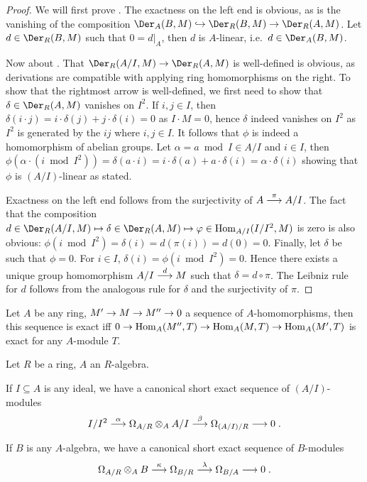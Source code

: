 \documentclass[a4paper,parskip=half,numbers=enddot, DIV=12, headheight=30pt]{scrreprt}
\begin{document}
\begin{proof}
    We will first prove . The exactness on the left end is obvious, as is the vanishing of the composition $\Der_A(B,M) \monomorphism \Der_R(B,M) \morphism \Der_R(A,M)$. Let $d\in \Der_R(B,M)$ such that $0 = d|_A$, then $d$ is $A$-linear, i.e.\ $d\in \Der_A(B,M)$.
    
    Now about . That $\Der_R(A/I,M) \morphism \Der_R(A,M)$ is well-defined is obvious, as derivations are compatible with applying ring homomorphisms on the right. To show that the rightmost arrow is well-defined, we first need to show that $\delta\in\Der_R(A,M)$ vanishes on $I^2$. If $i,j\in I$, then $\delta(i\cdot j)=i\cdot\delta(j)+j\cdot\delta(i)=0$ as $I\cdot M=0$, hence $\delta$ indeed vanishes on $I^2$ as $I^2$ is generated by the $ij$ where $i,j\in I$. It follows that $\phi$ is indeed a homomorphism of abelian groups. Let $\alpha = a\bmod I\in A/I$ and $i\in I$, then $\phi(\alpha \cdot (i\bmod I^2)) = \delta(a\cdot i) = i\cdot \delta(a) + a\cdot \delta(i) = \alpha\cdot\delta(i)$ showing that $\phi$ is $(A/I)$-linear as stated. 
    
    Exactness on the left end follows from the surjectivity of $A\morphism[\pi] A/I$. The fact that the composition $d\in\Der_R(A/I,M)\mapsto\delta\in\Der_R(A,M)\mapsto\phi\in\Hom_{A/I}(I/I^2,M)$ is zero is also obvious: $\phi(i\bmod I^2) = \delta(i) = d(\pi(i)) = d(0) = 0$. Finally, let $\delta$ be such that $\phi = 0$. For $i\in I$, $\delta(i) = \phi(i\bmod I^2) = 0$. Hence there exists a unique group homomorphism $A/I \morphism[d] M$ such that $\delta = d\circ \pi$. The Leibniz rule for $d$ follows from the analogous rule for $\delta$ and the surjectivity of $\pi$.
\end{proof}
\begin{fact*}
    Let $A$ be any ring, $M'\morphism M\morphism M''\morphism 0$ a sequence of $A$-homomorphisms, then this sequence is exact iff $0\morphism\Hom_A(M'',T) \morphism \Hom_A(M,T) \morphism\Hom_A(M',T)$ is exact for any $A$-module $T$.
\end{fact*}
\begin{cor}
    Let $R$ be a ring, $A$ an $R$-algebra. 
    \begin{alphanumerate}
        \item 
            If $I\subseteq A$ is any ideal, we have a canonical short exact sequence of $(A/I)$-modules
            \begin{align}\lbl{eq:tensorDerSpam1}
                I/I^2\morphism[\alpha] \Omega_{A/R} \otimes_A A/I \morphism[\beta] \Omega_{(A/I)/R} \morphism 0\;.
            \end{align}
        \item 
            If $B$ is any $A$-algebra, we have a canonical short exact sequence of $B$-modules
            \begin{align}\lbl{eq:tensorDerSpam2}
                \Omega_{A/R}\otimes_A B \morphism[\kappa] \Omega_{B/R} \morphism[\lambda] \Omega_{B/A} \morphism 0\;.
            \end{align}
    \end{alphanumerate}
\end{cor}
\end{document}
